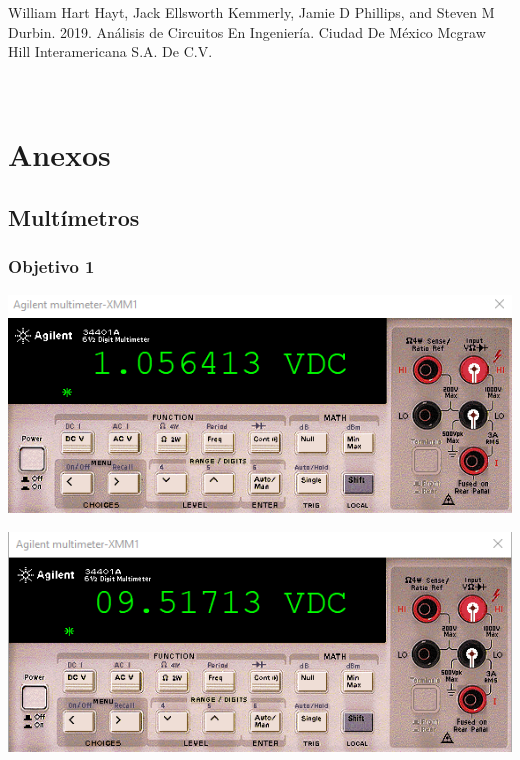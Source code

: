 \documentclass[DIV=calc, paper=a4, fontsize=11pt]{scrartcl}
\newenvironment{Figura}
  {\par\medskip\noindent\minipage{\linewidth}}
  {\endminipage\par\medskip}
\begin{document}
\begin{multicols}{2}
\begin{thebibliography}{99}
 William Hart Hayt, Jack Ellsworth Kemmerly, Jamie D Phillips, and Steven M Durbin. 2019. Análisis de Circuitos En Ingeniería. Ciudad De México Mcgraw Hill Interamericana S.A. De C.V.

‌

\end{thebibliography}

\section*{Anexos}

\subsection*{Multímetros}

\subsubsection*{Objetivo 1}

\begin{Figura}
    \centering
    \includegraphics[width=1\textwidth]{1.a.multi.PNG}
    \label{fig}
\end{Figura}

\begin{Figura}
    \centering
    \includegraphics[width=1\textwidth]{1.b.multi.PNG}
    \label{fig}
\end{Figura}


\end{multicols}
\end{document}
